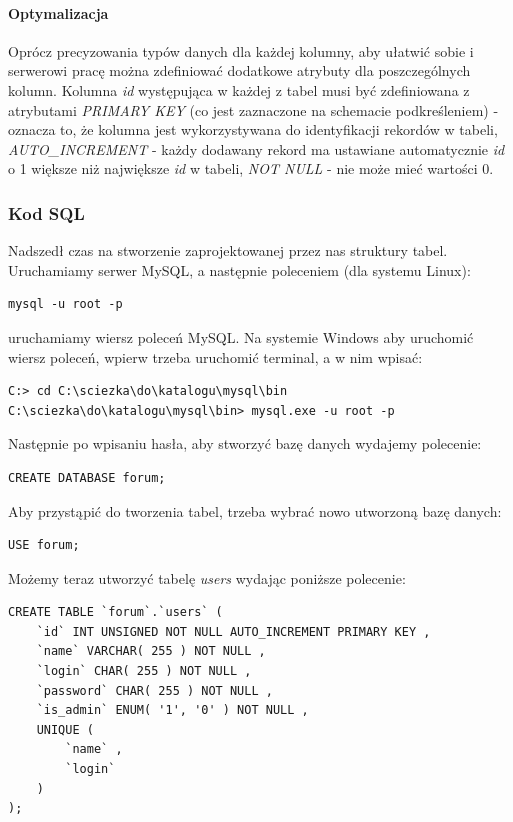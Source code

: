 \documentclass[a4paper,10pt]{article}
\begin{document}
\paragraph{Optymalizacja}
Oprócz precyzowania typów danych dla każdej kolumny, aby ułatwić sobie i serwerowi pracę można zdefiniować dodatkowe atrybuty dla poszczególnych kolumn. Kolumna \textit{id} występująca w każdej z tabel musi być zdefiniowana z atrybutami \textit{PRIMARY KEY} (co jest zaznaczone na schemacie podkreśleniem) - oznacza to, że kolumna jest wykorzystywana do identyfikacji rekordów w tabeli, \textit{AUTO\_INCREMENT} - każdy dodawany rekord ma ustawiane automatycznie \textit{id} o 1 większe niż największe \textit{id} w tabeli, \textit{NOT NULL} - nie może mieć wartości 0.

\subsubsection{Kod SQL}
Nadszedł czas na stworzenie zaprojektowanej przez nas struktury tabel. Uruchamiamy serwer MySQL, a następnie poleceniem (dla systemu Linux): \\
\begin{verbatim}
mysql -u root -p
\end{verbatim}
uruchamiamy wiersz poleceń MySQL.
Na systemie Windows aby uruchomić wiersz poleceń, wpierw trzeba uruchomić terminal, a w nim wpisać:  \\
\begin{verbatim}
C:> cd C:\sciezka\do\katalogu\mysql\bin
C:\sciezka\do\katalogu\mysql\bin> mysql.exe -u root -p
\end{verbatim}
Następnie po wpisaniu hasła, aby stworzyć bazę danych wydajemy polecenie: \\
\begin{verbatim}
CREATE DATABASE forum;
\end{verbatim}
Aby przystąpić do tworzenia tabel, trzeba wybrać nowo utworzoną bazę danych: \\
\begin{verbatim}
USE forum;
\end{verbatim}
Możemy teraz utworzyć tabelę \textit{users} wydając poniższe polecenie: \\
\begin{verbatim}
CREATE TABLE `forum`.`users` (
	`id` INT UNSIGNED NOT NULL AUTO_INCREMENT PRIMARY KEY ,
	`name` VARCHAR( 255 ) NOT NULL ,
	`login` CHAR( 255 ) NOT NULL ,
	`password` CHAR( 255 ) NOT NULL ,
	`is_admin` ENUM( '1', '0' ) NOT NULL ,
	UNIQUE (
		`name` ,
		`login` 
	)
);
\end{verbatim}
\end{document}
